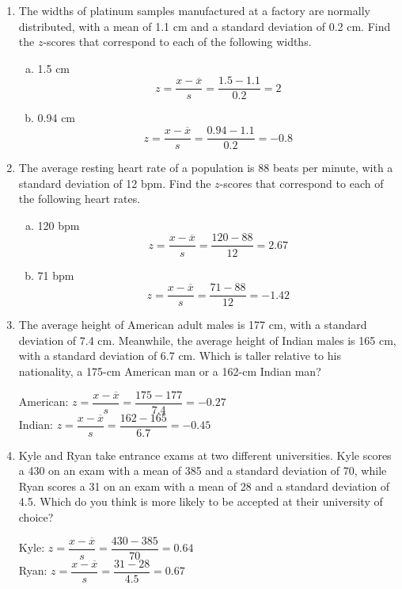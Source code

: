 \begin{enumerate}
\item The widths of platinum samples manufactured at a factory are normally distributed, with a mean of 1.1 cm and a standard deviation of 0.2 cm.  Find the $z$-scores that correspond to each of the following widths.
\begin{enumerate}[(a)]
\item 1.5 cm 
\[z = \dfrac{x - \overline{x}}{s} = \dfrac{1.5 - 1.1}{0.2} = 2\]
\item 0.94 cm 
\[z = \dfrac{x - \overline{x}}{s} = \dfrac{0.94 - 1.1}{0.2} = -0.8\]
\end{enumerate}

\item The average resting heart rate of a population is 88 beats per minute, with a standard deviation of 12 bpm.  Find the $z$-scores that correspond to each of the following heart rates.
\begin{enumerate}[(a)]
\item 120 bpm 
\[z = \dfrac{x - \overline{x}}{s} = \dfrac{120 - 88}{12} = 2.67\]
\item 71 bpm 
\[z = \dfrac{x - \overline{x}}{s} = \dfrac{71 - 88}{12} = -1.42\]
\end{enumerate}

\item The average height of American adult males is 177 cm, with a standard deviation of 7.4 cm.  Meanwhile, the average height of Indian males is 165 cm, with a standard deviation of 6.7 cm.  Which is taller relative to his nationality, a 175-cm American man or a 162-cm Indian man? 
\begin{center}
American: $z = \dfrac{x - \overline{x}}{s} = \dfrac{175 - 177}{7.4} = -0.27$\\
Indian: $z = \dfrac{x - \overline{x}}{s} = \dfrac{162 - 165}{6.7} = -0.45$
\end{center}

\item Kyle and Ryan take entrance exams at two different universities.  Kyle scores a 430 on an exam with a mean of 385 and a standard deviation of 70, while Ryan scores a 31 on an exam with a mean of 28 and a standard deviation of 4.5.  Which do you think is more likely to be accepted at their university of choice? 
\begin{center}
Kyle: $z = \dfrac{x - \overline{x}}{s} = \dfrac{430 - 385}{70} = 0.64$\\
Ryan: $z = \dfrac{x - \overline{x}}{s} = \dfrac{31 - 28}{4.5} = 0.67$
\end{center}


\end{enumerate}
